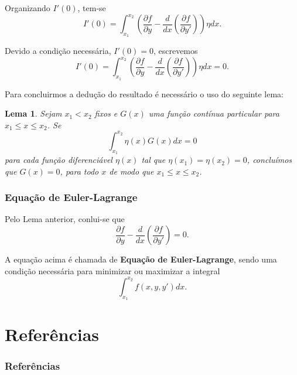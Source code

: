 \documentclass{beamer}
\newtheorem{lema}{Lema}
\newif\ifcompilepause
\newcommand{\cpause}{
	\ifcompilepause
	\pause
	\fi
}
\begin{document}
	\begin{frame}
		\justify
	
		Organizando $I'(0)$, tem-se
		$$
			I'(0)=\int_{x_1}^{x_2}\left (
				\frac{\partial f}{\partial y} -
				\frac{d}{dx}
				\left (
					\frac{\partial f}{\partial y'}
				\right )
			\right )\eta dx
			\text{.}
		$$
		\cpause
		
		Devido a condição necessária, $I'(0)=0$, escrevemos
		$$
			I'(0)=\int_{x_1}^{x_2}\left (
				\frac{\partial f}{\partial y} -
				\frac{d}{dx}
				\left (
					\frac{\partial f}{\partial y'}
				\right )
			\right )\eta dx = 0
			\text{.}
		$$
	\end{frame}

	\begin{frame}
		\justify
		Para concluirmos a dedução do resultado é necessário o uso do seguinte lema:
	
		\begin{lema}
			\justify
			Sejam $x_1 < x_2$ fixos e $G(x)$ uma função contínua particular para $x_1 \leqslant x \leqslant x_2$. Se $$\int_{x_1}^{x_2} \eta (x) G(x) dx = 0$$ para cada função diferenciável $\eta (x)$ tal que $\eta (x_1)=\eta (x_2)=0$, concluímos que $G(x)=0$, para todo $x$ de modo que $x_1 \leqslant x \leqslant x_2$.
		\end{lema}	
	
	\end{frame}

	\begin{frame}
		\frametitle{Equação de Euler-Lagrange}
		\justify
	
		Pelo Lema anterior, conlui-se que
		$$
			\frac{\partial f}{\partial y} - \frac{d}{dx} \left ( \frac{\partial f}{\partial y'} \right )=0 \text{.}
		$$
		\cpause
	
		A equação acima é chamada de \textbf{Equação de Euler-Lagrange}, sendo uma condição necessária para minimizar ou maximizar a integral
		$$
			\int_{x_1}^{x_2} f(x, y, y')dx \text{.}
		$$
	\end{frame}

	\section{Referências}
	\begin{frame}
		\frametitle{Referências}
		
	\end{frame}
\end{document}
